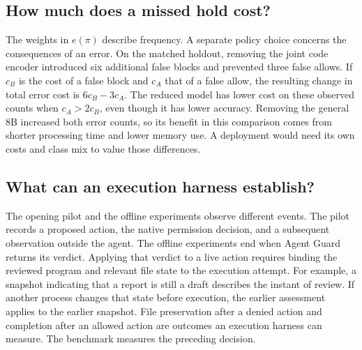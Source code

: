 \subsection{How much does a missed hold cost?}
The weights in $e(\pi)$ describe frequency. A separate policy choice concerns the consequences of an error. On the matched holdout, removing the joint code encoder introduced six additional false blocks and prevented three false allows. If $c_B$ is the cost of a false block and $c_A$ that of a false allow, the resulting change in total error cost is $6c_B-3c_A$. The reduced model has lower cost on these observed counts when $c_A>2c_B$, even though it has lower accuracy. Removing the general 8B increased both error counts, so its benefit in this comparison comes from shorter processing time and lower memory use. A deployment would need its own costs and class mix to value those differences.

\subsection{What can an execution harness establish?}
The opening pilot and the offline experiments observe different events. The pilot records a proposed action, the native permission decision, and a subsequent observation outside the agent. The offline experiments end when Agent Guard returns its verdict. Applying that verdict to a live action requires binding the reviewed program and relevant file state to the execution attempt. For example, a snapshot indicating that a report is still a draft describes the instant of review. If another process changes that state before execution, the earlier assessment applies to the earlier snapshot. File preservation after a denied action and completion after an allowed action are outcomes an execution harness can measure. The benchmark measures the preceding decision.

